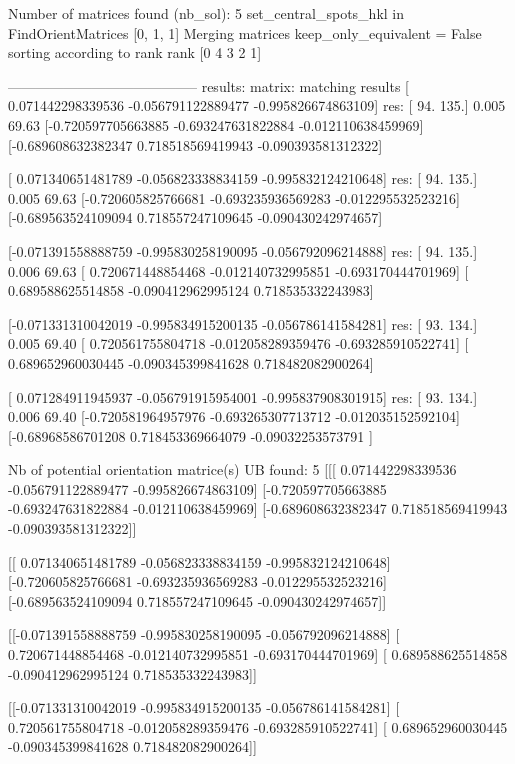 \documentclass[letterpaper,10pt,english]{sphinxmanual}
\begin{document}
\begin{sphinxalltt}
Number of matrices found (nb\_sol):  5
set\_central\_spots\_hkl in FindOrientMatrices {[}0, 1, 1{]}
Merging matrices
keep\_only\_equivalent = False
sorting according to rank
rank {[}0 4 3 2 1{]}

-----------------------------------------
results:
matrix:                                         matching results
{[} 0.071442298339536 -0.056791122889477 -0.995826674863109{]}        res: {[} 94. 135.{]} 0.005 69.63
{[}-0.720597705663885 -0.693247631822884 -0.012110638459969{]}
{[}-0.689608632382347  0.718518569419943 -0.090393581312322{]}

{[} 0.071340651481789 -0.056823338834159 -0.995832124210648{]}        res: {[} 94. 135.{]} 0.005 69.63
{[}-0.720605825766681 -0.693235936569283 -0.012295532523216{]}
{[}-0.689563524109094  0.718557247109645 -0.090430242974657{]}

{[}-0.071391558888759 -0.995830258190095 -0.056792096214888{]}        res: {[} 94. 135.{]} 0.006 69.63
{[} 0.720671448854468 -0.012140732995851 -0.693170444701969{]}
{[} 0.689588625514858 -0.090412962995124  0.718535332243983{]}

{[}-0.071331310042019 -0.995834915200135 -0.056786141584281{]}        res: {[} 93. 134.{]} 0.005 69.40
{[} 0.720561755804718 -0.012058289359476 -0.693285910522741{]}
{[} 0.689652960030445 -0.090345399841628  0.718482082900264{]}

{[} 0.071284911945937 -0.056791915954001 -0.995837908301915{]}        res: {[} 93. 134.{]} 0.006 69.40
{[}-0.720581964957976 -0.693265307713712 -0.012035152592104{]}
{[}-0.68968586701208   0.718453369664079 -0.09032253573791 {]}

Nb of potential orientation matrice(s) UB found: 5
{[}{[}{[} 0.071442298339536 -0.056791122889477 -0.995826674863109{]}
  {[}-0.720597705663885 -0.693247631822884 -0.012110638459969{]}
  {[}-0.689608632382347  0.718518569419943 -0.090393581312322{]}{]}

 {[}{[} 0.071340651481789 -0.056823338834159 -0.995832124210648{]}
  {[}-0.720605825766681 -0.693235936569283 -0.012295532523216{]}
  {[}-0.689563524109094  0.718557247109645 -0.090430242974657{]}{]}

 {[}{[}-0.071391558888759 -0.995830258190095 -0.056792096214888{]}
  {[} 0.720671448854468 -0.012140732995851 -0.693170444701969{]}
  {[} 0.689588625514858 -0.090412962995124  0.718535332243983{]}{]}

 {[}{[}-0.071331310042019 -0.995834915200135 -0.056786141584281{]}
  {[} 0.720561755804718 -0.012058289359476 -0.693285910522741{]}
  {[} 0.689652960030445 -0.090345399841628  0.718482082900264{]}{]}


\end{sphinxalltt}
\end{document}

